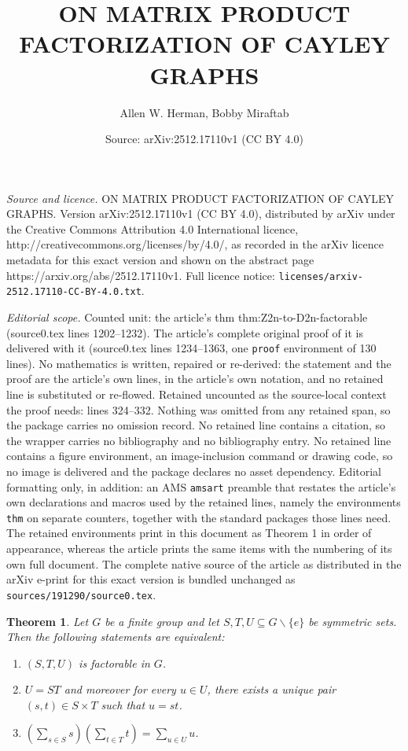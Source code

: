 \documentclass[10pt,a4paper]{amsart}
\title{\centering\MakeUppercase{On Matrix Product Factorization of Cayley graphs}}
\author{Allen W. Herman, Bobby Miraftab}
\date{Source: arXiv:2512.17110v1 (CC BY 4.0)}
\newtheorem{thm}{Theorem}
\newcommand{\sm}{\smallsetminus}
\begin{document}
\maketitle

\noindent\emph{Source and licence.} \centering\MakeUppercase{On Matrix Product Factorization of Cayley graphs}. Version arXiv:2512.17110v1 (CC BY 4.0), distributed by arXiv under the Creative Commons Attribution 4.0 International licence, http://creativecommons.org/licenses/by/4.0/, as recorded in the arXiv licence metadata for this exact version and shown on the abstract page https://arxiv.org/abs/2512.17110v1. Full licence notice: \texttt{licenses/arxiv-2512.17110-CC-BY-4.0.txt}.\par\smallskip

\noindent\textit{Editorial scope.} Counted unit: the article's thm thm:Z2n-to-D2n-factorable (source0.tex lines 1202--1232). The article's complete original proof of it is delivered with it (source0.tex lines 1234--1363, one \texttt{proof} environment of 130 lines). No mathematics is written, repaired or re-derived: the statement and the proof are the article's own lines, in the article's own notation, and no retained line is substituted or re-flowed.  Retained uncounted as the source-local context the proof needs: lines 324--332.  Nothing was omitted from any retained span, so the package carries no omission record.  No retained line contains a citation, so the wrapper carries no bibliography and no bibliography entry.  No retained line contains a figure environment, an image-inclusion command or drawing code, so no image is delivered and the package declares no asset dependency.  Editorial formatting only, in addition: an AMS \texttt{amsart} preamble that restates the article's own declarations and macros used by the retained lines, namely the environments \texttt{thm} on separate counters, together with the standard packages those lines need.  The retained environments print in this document as Theorem 1 in order of appearance, whereas the article prints the same items with the numbering of its own full document.  The complete native source of the article as distributed in the arXiv e-print for this exact version is bundled unchanged as \texttt{sources/191290/source0.tex}.
\begin{thm}\label{thm:main_1}
Let $G$ be a finite group and let $S,T,U \subseteq G\sm \{e\}$ be symmetric sets. 
Then the following statements are equivalent:
\begin{enumerate}
    \item $(S,T,U)$ is factorable in $G$.
    \item $U=ST$ and moreover for every $u\in U $, there exists a unique pair $(s,t)\in S\times T$ such that $u=st$.
    \item $(\sum_{s\in S} s)(\sum_{t\in T}t )=\sum_{u\in U}u$.
\end{enumerate}
\end{thm}
\end{document}
